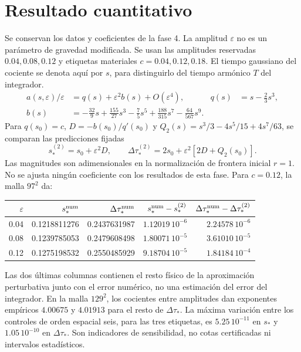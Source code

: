 \documentclass[11pt,a4paper]{article}
\newcommand{\eps}{\varepsilon}
\begin{document}
\section{Resultado cuantitativo}
Se conservan los datos y coeficientes de la fase 4. La amplitud $\eps$ no es un parámetro de gravedad modificada. Se usan las amplitudes reservadas $0.04,0.08,0.12$ y etiquetas materiales $c=0.04,0.12,0.18$. El tiempo gaussiano del cociente se denota aquí por $s$, para distinguirlo del tiempo armónico $T$ del integrador.
\begin{align}
 a(s,\eps)/\eps&=q(s)+\eps^2b(s)+O(\eps^4),&q(s)&=s-\tfrac23s^3,\\
 b(s)&=-\tfrac{32}{9}s+\tfrac{155}{27}s^3-\tfrac75s^5
       +\tfrac{188}{315}s^7-\tfrac{64}{567}s^9.\label{b}
\end{align}
Para $q(s_0)=c$, $D=-b(s_0)/q'(s_0)$ y
$Q_2(s)=s^3/3-4s^5/15+4s^7/63$, se comparan las predicciones fijadas
\begin{equation}
 s_*^{(2)}=s_0+\eps^2D,\qquad
 \Delta\tau_*^{(2)}=2s_0+\eps^2[2D+Q_2(s_0)].\label{pred}
\end{equation}
Las magnitudes son adimensionales en la normalización de frontera inicial $r=1$. No se ajusta ningún coeficiente con los resultados de esta fase. Para $c=0.12$, la malla $97^2$ da:
\begin{center}
\small
\begin{tabular}{@{}rrrrr@{}}
\toprule
$\eps$ & $s_*^{\rm num}$ & $\Delta\tau_*^{\rm num}$ & $s_*^{\rm num}-s_*^{(2)}$ & $\Delta\tau_*^{\rm num}-\Delta\tau_*^{(2)}$\\
\midrule
0.04 & 0.1218811276 & 0.2437631987 & $1.12019\,10^{-6}$ & $2.24578\,10^{-6}$\\
0.08 & 0.1239785053 & 0.2479608498 & $1.80071\,10^{-5}$ & $3.61010\,10^{-5}$\\
0.12 & 0.1275198532 & 0.2550485929 & $9.18704\,10^{-5}$ & $1.84184\,10^{-4}$\\
\bottomrule
\end{tabular}
\end{center}
Las dos últimas columnas contienen el resto físico de la aproximación perturbativa junto con el error numérico, no una estimación del error del integrador. En la malla $129^2$, los cocientes entre amplitudes dan exponentes empíricos $4.00675$ y $4.01913$ para el resto de $\Delta\tau_*$. La máxima variación entre los controles de orden espacial seis, para las tres etiquetas, es $5.25\,10^{-11}$ en $s_*$ y $1.05\,10^{-10}$ en $\Delta\tau_*$. Son indicadores de sensibilidad, no cotas certificadas ni intervalos estadísticos.
\end{document}
